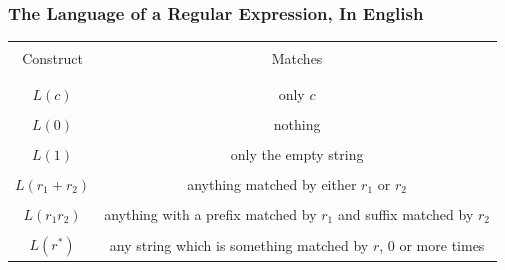 \documentclass[aspectratio=169]{beamer}
\begin{document}
\begin{frame}[fragile]
  \frametitle{The Language of a Regular Expression, In English}

  \begin{center}
    \begin{tabular}{c || c}
      \hline & \\[-1.5ex]
      Construct & Matches \\ [2pt]
      \hline & \\[-2ex]
      \hline & \\[-1.5ex]
      $L(c)$ & only $c$ \\ [2pt]
      \hline & \\[-1.5ex]
      $L(0)$ & nothing \\ [2pt]
      \hline & \\[-1.5ex]
      $L(1)$ & only the empty string \\ [2pt]
      \hline & \\[-1.5ex]
      $L(r_1 + r_2)$ & anything matched by either $r_1$ or $r_2$ \\ [2pt]
      \hline & \\[-1.5ex]
      $L(r_1r_2)$ & anything with a prefix matched by $r_1$ and suffix matched by $r_2$ \\ [2pt]
      \hline & \\[-1.5ex]
      $L(r^*)$ & any string which is something matched by $r$, 0 or more times \\ [2pt]
      \hline
    \end{tabular}
  \end{center}
\end{frame}
\end{document}
